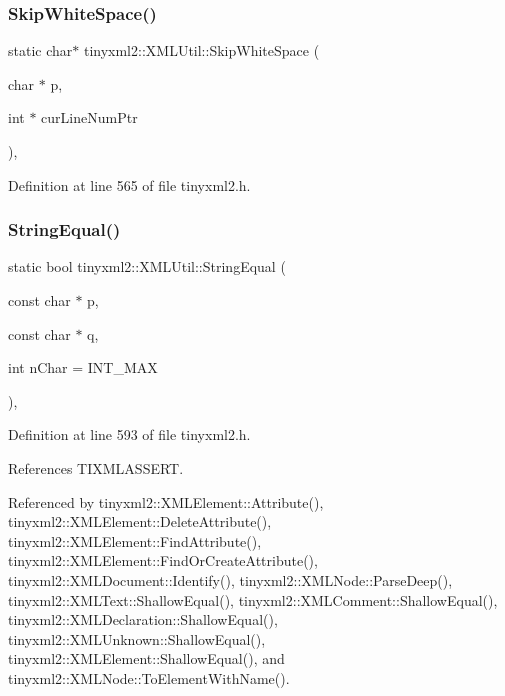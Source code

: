 \subsubsection{Skip\+White\+Space()\hspace{0.1cm}{\footnotesize\ttfamily [2/2]}}
{\footnotesize\ttfamily static char$\ast$ tinyxml2\+::\+X\+M\+L\+Util\+::\+Skip\+White\+Space (\begin{DoxyParamCaption}\item[{char $\ast$}]{p,  }\item[{int $\ast$}]{cur\+Line\+Num\+Ptr }\end{DoxyParamCaption})\hspace{0.3cm}{\ttfamily [inline]}, {\ttfamily [static]}}



Definition at line 565 of file tinyxml2.\+h.

\mbox{\label{classtinyxml2_1_1_x_m_l_util_acfcd287cacfd2533e1bc9ea4dfb56602}} 
\subsubsection{String\+Equal()}
{\footnotesize\ttfamily static bool tinyxml2\+::\+X\+M\+L\+Util\+::\+String\+Equal (\begin{DoxyParamCaption}\item[{const char $\ast$}]{p,  }\item[{const char $\ast$}]{q,  }\item[{int}]{n\+Char = {\ttfamily INT\+\_\+MAX} }\end{DoxyParamCaption})\hspace{0.3cm}{\ttfamily [inline]}, {\ttfamily [static]}}



Definition at line 593 of file tinyxml2.\+h.



References T\+I\+X\+M\+L\+A\+S\+S\+E\+RT.



Referenced by tinyxml2\+::\+X\+M\+L\+Element\+::\+Attribute(), tinyxml2\+::\+X\+M\+L\+Element\+::\+Delete\+Attribute(), tinyxml2\+::\+X\+M\+L\+Element\+::\+Find\+Attribute(), tinyxml2\+::\+X\+M\+L\+Element\+::\+Find\+Or\+Create\+Attribute(), tinyxml2\+::\+X\+M\+L\+Document\+::\+Identify(), tinyxml2\+::\+X\+M\+L\+Node\+::\+Parse\+Deep(), tinyxml2\+::\+X\+M\+L\+Text\+::\+Shallow\+Equal(), tinyxml2\+::\+X\+M\+L\+Comment\+::\+Shallow\+Equal(), tinyxml2\+::\+X\+M\+L\+Declaration\+::\+Shallow\+Equal(), tinyxml2\+::\+X\+M\+L\+Unknown\+::\+Shallow\+Equal(), tinyxml2\+::\+X\+M\+L\+Element\+::\+Shallow\+Equal(), and tinyxml2\+::\+X\+M\+L\+Node\+::\+To\+Element\+With\+Name().

